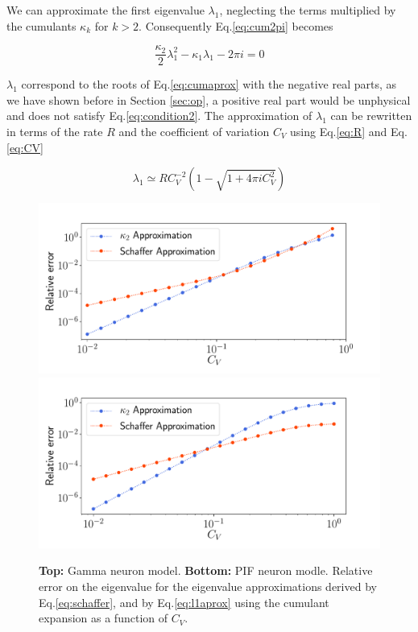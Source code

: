 \documentclass[12pt,twoside]{report}
\begin{document}
We can approximate the first eigenvalue $\lambda_1$, neglecting the terms multiplied by the cumulants $\kappa_k$ for $k>2$. Consequently Eq.\eqref{eq:cum2pi} becomes

\begin{equation}
\label{eq:cumaprox}
\frac{\kappa_2}{2}\lambda_1^2-\kappa_1\lambda_1 -2\pi i=0
\end{equation}

$\lambda_1$ correspond to the roots of Eq.\eqref{eq:cumaprox} with the negative real parts, as we have shown before in Section \ref{sec:op}, a positive real part would be unphysical and does not satisfy Eq.\eqref{eq:condition2}. The approximation of $\lambda_1$ can be rewritten in terms of the rate $R$ and the coefficient of variation $C_V$ using Eq.\eqref{eq:R} and Eq.\eqref{eq:CV}

\begin{equation}
\label{eq:l1aprox}
\lambda_1\simeq RC_V^{-2}\left( 1-\sqrt{1+4\pi i C_V^2}\right)
\end{equation}

\begin{figure}[h!]
	\centering
	\includegraphics[width=0.8\linewidth]{kumulant_gamma.pdf}
	\centering
	\includegraphics[width=0.8\linewidth]{kumulant_pif.pdf}
	\caption{\textbf{Top:} Gamma  neuron model. \textbf{Bottom:} PIF neuron modle. Relative error on the eigenvalue for the eigenvalue approximations derived by \cite{SchOst13} Eq.\eqref{eq:schaffer}, and by Eq.\eqref{eq:l1aprox} using the cumulant expansion as a function of $C_V$.}
	\label{fig:kumulant}
\end{figure}
\end{document}
